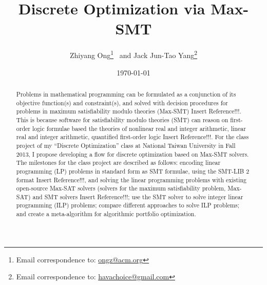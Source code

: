 \documentclass[letter,12pt]{article}
\begin{document}
\title{Discrete Optimization via Max-SMT}
\date{\today}
\author{Zhiyang Ong\thanks{Email correspondence to: \href{mailto:ongz@acm.org}{ongz@acm.org}} 
	\ and Jack Jun-Tao Yang\thanks{Email correspondence to: \href{mailto:havachoice@gmail.com}{havachoice@gmail.com}}
}
\maketitle



\begin{abstract}
Problems in mathematical programming can be formulated as a conjunction of its objective function(s) and constraint(s), and solved with decision procedures for problems in maximum satisfiability modulo theories (Max-SMT) {\LARGE Insert Reference!!!}. This is because software for satisfiability modulo theories (SMT) can reason on first-order logic formulae based the theories of nonlinear real and integer arithmetic, linear real and integer arithmetic, quantified first-order logic {\LARGE Insert Reference!!!}. For the class project of my ``Discrete Optimization'' class at National Taiwan University in Fall 2013, I propose developing a flow for discrete optimization based on Max-SMT solvers. The milestones for the class project are described as follows: encoding linear programming (LP) problems in standard form as SMT formulae, using the SMT-LIB 2 format {\LARGE Insert Reference!!!}, and solving the linear programming problems with existing open-source Max-SAT solvers (solvers for the maximum satisfiability problem, Max-SAT) and SMT solvers {\LARGE Insert Reference!!!}; use the SMT solver to solve integer linear programming (ILP) problems; compare different approaches to solve ILP problems; and create a meta-algorithm for algorithmic portfolio optimization.
\end{abstract}
\end{document}
